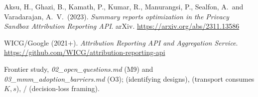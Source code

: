 \begin{enumerate}[label={[\arabic*]},leftmargin=2.5em]
\item Aksu, H., Ghazi, B., Kamath, P., Kumar, R., Manurangsi, P., Sealfon, A.\ and Varadarajan, A.\ V.\ (2023). \emph{Summary reports optimization in the Privacy Sandbox Attribution Reporting API}. arXiv. \url{https://arxiv.org/abs/2311.13586}
\item WICG/Google (2021+). \emph{Attribution Reporting API and Aggregation Service}. \url{https://github.com/WICG/attribution-reporting-api}
\item Frontier study, \emph{02\_open\_questions.md} (M9) and \emph{03\_mmm\_adoption\_barriers.md} (O3);  (identifying designs),  (transport consumes $K,s$), / (decision-loss framing).
\end{enumerate}
\endgroup

